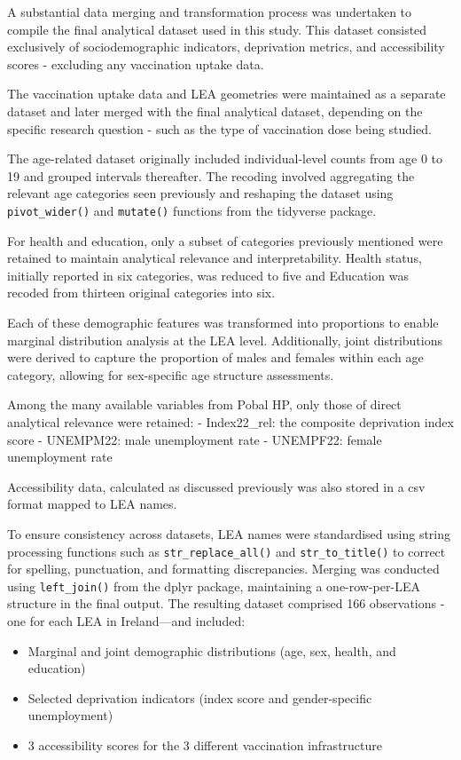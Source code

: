 \documentclass{article}
\providecommand{\tightlist}{%
  \setlength{\itemsep}{0pt}\setlength{\parskip}{0pt}}
\begin{document}
A substantial data merging and transformation process was undertaken to
compile the final analytical dataset used in this study. This dataset
consisted exclusively of sociodemographic indicators, deprivation
metrics, and accessibility scores - excluding any vaccination uptake
data.

The vaccination uptake data and LEA geometries were maintained as a
separate dataset and later merged with the final analytical dataset,
depending on the specific research question - such as the type of
vaccination dose being studied.

The age-related dataset originally included individual-level counts from
age 0 to 19 and grouped intervals thereafter. The recoding involved
aggregating the relevant age categories seen previously and reshaping
the dataset using \texttt{pivot\_wider()} and \texttt{mutate()}
functions from the tidyverse package.

For health and education, only a subset of categories previously
mentioned were retained to maintain analytical relevance and
interpretability. Health status, initially reported in six categories,
was reduced to five and Education was recoded from thirteen original
categories into six.

Each of these demographic features was transformed into proportions to
enable marginal distribution analysis at the LEA level. Additionally,
joint distributions were derived to capture the proportion of males and
females within each age category, allowing for sex-specific age
structure assessments.

Among the many available variables from Pobal HP, only those of direct
analytical relevance were retained: - Index22\_rel: the composite
deprivation index score - UNEMPM22: male unemployment rate - UNEMPF22:
female unemployment rate

Accessibility data, calculated as discussed previously was also stored
in a csv format mapped to LEA names.

To ensure consistency across datasets, LEA names were standardised using
string processing functions such as \texttt{str\_replace\_all()} and
\texttt{str\_to\_title()} to correct for spelling, punctuation, and
formatting discrepancies. Merging was conducted using
\texttt{left\_join()} from the dplyr package, maintaining a
one-row-per-LEA structure in the final output. The resulting dataset
comprised 166 observations - one for each LEA in Ireland---and included:

\begin{itemize}
\tightlist
\item
  Marginal and joint demographic distributions (age, sex, health, and
  education)
\item
  Selected deprivation indicators (index score and gender-specific
  unemployment)
\item
  3 accessibility scores for the 3 different vaccination infrastructure
\end{itemize}
\end{document}
